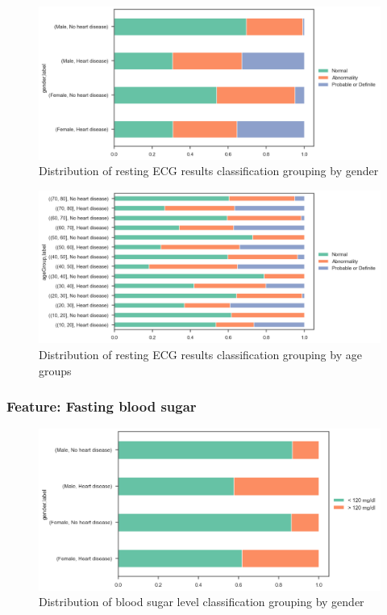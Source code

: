 \begin{figure}
    \caption{Distribution of resting ECG results classification grouping by gender}\label{frequency-ecg-gender-percent}
    \centering
    \includegraphics[width=\linewidth]{media/frequency-05-gender-ecg.png}
\end{figure}

\begin{figure}
    \caption{Distribution of resting ECG results classification grouping by age groups}\label{frequency-ecg-agegroup-percent}
    \centering
    \includegraphics[width=\linewidth]{media/frequency-06-agegroup-ecg.png}
\end{figure}

\subsubsection{Feature: Fasting blood sugar}

\begin{figure}
    \caption{Distribution of blood sugar level classification grouping by gender}\label{frequency-bloodsugar-gender-percent}
    \centering
    \includegraphics[width=\linewidth]{media/frequency-07-gender-bloodsugar.png}
\end{figure}

